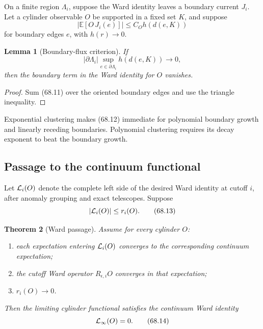 \documentclass[11pt]{article}
\newtheorem{theorem}{Theorem}[section]
\newtheorem{lemma}[theorem]{Lemma}
\begin{document}
On a finite region \(\Lambda_i\), suppose the Ward identity leaves a
boundary current \(J_i\).  Let a cylinder observable \(O\) be supported
in a fixed set \(K\), and suppose
\[
       |{\mathbb E}[O\,J_i(e)]|
        \le C_O h(d(e,K))                                    \tag{68.11}
\]
for boundary edges \(e\), with \(h(r)\to0\).

\begin{lemma}[Boundary-flux criterion]
\label{lem:v11v68-boundary}
If
\[
                         |\partial\Lambda_i|
               \sup_{e\in\partial\Lambda_i}h(d(e,K))
                              \longrightarrow0,               \tag{68.12}
\]
then the boundary term in the Ward identity for \(O\) vanishes.
\end{lemma}

\begin{proof}
Sum (68.11) over the oriented boundary edges and use the triangle
inequality.
\end{proof}

Exponential clustering makes (68.12) immediate for polynomial boundary
growth and linearly receding boundaries.  Polynomial clustering
requires its decay exponent to beat the boundary growth.

\subsection{Passage to the continuum functional}

Let \({\cal L}_i(O)\) denote the complete left side of the desired Ward
identity at cutoff \(i\), after anomaly grouping and exact telescopes.
Suppose
\[
                              |{\cal L}_i(O)|\le r_i(O).        \tag{68.13}
\]

\begin{theorem}[Ward passage]
\label{thm:v11v68-passage}
Assume for every cylinder \(O\):
\begin{enumerate}
\item each expectation entering \({\cal L}_i(O)\) converges to the
corresponding continuum expectation;
\item the cutoff Ward operator \(R_{\epsilon,i}O\) converges in that
expectation;
\item \(r_i(O)\to0\).
\end{enumerate}
Then the limiting cylinder functional satisfies the continuum Ward
identity
\[
                              {\cal L}_\infty(O)=0.            \tag{68.14}
\]
\end{theorem}
\end{document}
